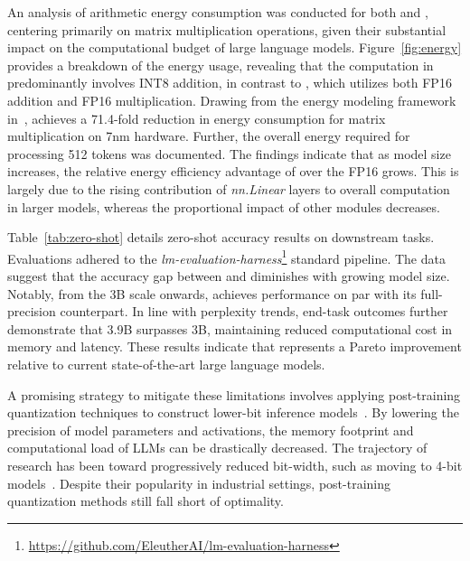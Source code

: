 An analysis of arithmetic energy consumption was conducted for both  and , centering primarily on matrix multiplication operations, given their substantial impact on the computational budget of large language models. Figure~\ref{fig:energy} provides a breakdown of the energy usage, revealing that the computation in  predominantly involves INT8 addition, in contrast to , which utilizes both FP16 addition and FP16 multiplication. Drawing from the energy modeling framework in~\cite{energycost, pokebnn},  achieves a 71.4-fold reduction in energy consumption for matrix multiplication on 7nm hardware. Further, the overall energy required for processing 512 tokens was documented. The findings indicate that as model size increases, the relative energy efficiency advantage of  over the FP16  grows. This is largely due to the rising contribution of \emph{nn.Linear} layers to overall computation in larger models, whereas the proportional impact of other modules decreases.

Table~\ref{tab:zero-shot} details zero-shot accuracy results on downstream tasks. Evaluations adhered to the \emph{lm-evaluation-harness}\footnote{\url{https://github.com/EleutherAI/lm-evaluation-harness}} standard pipeline. The data suggest that the accuracy gap between  and  diminishes with growing model size. Notably, from the 3B scale onwards,  achieves performance on par with its full-precision counterpart. In line with perplexity trends, end-task outcomes further demonstrate that  3.9B surpasses  3B, maintaining reduced computational cost in memory and latency. These results indicate that  represents a Pareto improvement relative to current state-of-the-art large language models.

A promising strategy to mitigate these limitations involves applying post-training quantization techniques to construct lower-bit inference models~\cite{smoothquant, gptq, quip, quip_sharp}. By lowering the precision of model parameters and activations, the memory footprint and computational load of LLMs can be drastically decreased. The trajectory of research has been toward progressively reduced bit-width, such as moving to 4-bit models~\cite{gptq, awq}. Despite their popularity in industrial settings, post-training quantization methods still fall short of optimality.

